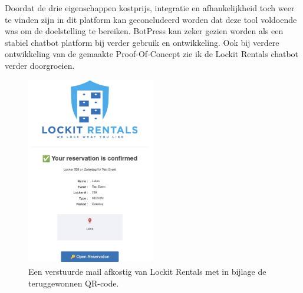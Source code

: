 Doordat de drie eigenschappen kostprijs, integratie en afhankelijkheid toch weer te vinden zijn in dit platform kan geconcludeerd worden dat deze tool voldoende was om de doelstelling te bereiken. BotPress kan zeker gezien worden als een stabiel chatbot platform bij verder gebruik en ontwikkeling. Ook bij verdere ontwikkeling van de gemaakte Proof-Of-Concept zie ik de Lockit Rentals chatbot verder doorgroeien.



\begin{figure}[h]
    \centering
    \includegraphics[width=0.5\textwidth]{graphics/F34_mailQR-code.jpg}
    \captionsetup{justification=centering, singlelinecheck=false}
    
    \caption{Een verstuurde mail afkostig van Lockit Rentals met in bijlage de teruggewonnen QR-code.}
    \label{fig:resultatEmailQR-code}
\end{figure}












